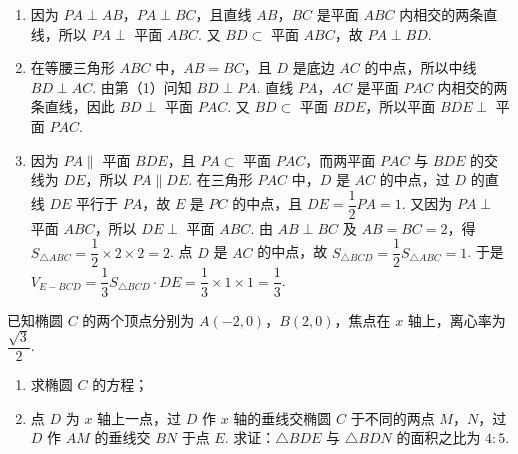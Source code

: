 \begin{solution}
\begin{enumerate}
\item 因为 \(PA\perp AB\)，\(PA\perp BC\)，且直线 \(AB\)，\(BC\) 是平面 \(ABC\) 内相交的两条直线，所以 \(PA\perp\) 平面 \(ABC\). 又 \(BD\subset\) 平面 \(ABC\)，故 \(PA\perp BD\).
\item 在等腰三角形 \(ABC\) 中，\(AB=BC\)，且 \(D\) 是底边 \(AC\) 的中点，所以中线 \(BD\perp AC\). 由第（1）问知 \(BD\perp PA\). 直线 \(PA\)，\(AC\) 是平面 \(PAC\) 内相交的两条直线，因此 \(BD\perp\) 平面 \(PAC\). 又 \(BD\subset\) 平面 \(BDE\)，所以平面 \(BDE\perp\) 平面 \(PAC\).
\item 因为 \(PA\parallel\) 平面 \(BDE\)，且 \(PA\subset\) 平面 \(PAC\)，而两平面 \(PAC\) 与 \(BDE\) 的交线为 \(DE\)，所以 \(PA\parallel DE\). 在三角形 \(PAC\) 中，\(D\) 是 \(AC\) 的中点，过 \(D\) 的直线 \(DE\) 平行于 \(PA\)，故 \(E\) 是 \(PC\) 的中点，且 \(DE=\dfrac12PA=1\).
又因为 \(PA\perp\) 平面 \(ABC\)，所以 \(DE\perp\) 平面 \(ABC\). 由 \(AB\perp BC\) 及 \(AB=BC=2\)，得 \(S_{\triangle ABC}=\dfrac12\times2\times2=2\). 点 \(D\) 是 \(AC\) 的中点，故 \(S_{\triangle BCD}=\dfrac12S_{\triangle ABC}=1\). 于是
\(V_{E-BCD}=\dfrac13S_{\triangle BCD}\cdot DE=\dfrac13\times1\times1=\dfrac13\).
\end{enumerate}
\end{solution}

\begin{problem}

已知椭圆 \(C\) 的两个顶点分别为 \(A(-2,0)\)，\(B(2,0)\)，焦点在 \(x\) 轴上，离心率为 \(\dfrac{\sqrt3}{2}\).

\begin{enumerate}
\item 求椭圆 \(C\) 的方程；
\item 点 \(D\) 为 \(x\) 轴上一点，过 \(D\) 作 \(x\) 轴的垂线交椭圆 \(C\) 于不同的两点 \(M\)，\(N\)，过 \(D\) 作 \(AM\) 的垂线交 \(BN\) 于点 \(E\). 求证：\(\triangle BDE\) 与 \(\triangle BDN\) 的面积之比为 \(4:5\).
\end{enumerate}
\end{problem}

